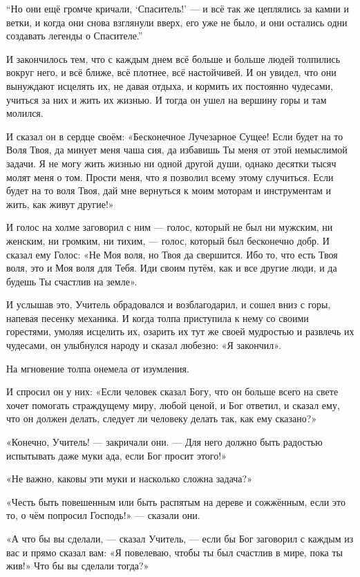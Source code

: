 ``Но они ещё громче кричали, `Спаситель!' --- и всё так же цеплялись за камни и ветки, и когда они снова взглянули вверх, его уже не было, и они остались одни создавать легенды о Спасителе.''

И закончилось тем, что с каждым днем всё больше и больше людей толпились вокруг него, и всё ближе,
всё плотнее, всё настойчивей. И он увидел, что они вынуждают исцелять их, не давая отдыха, и кормить их постоянно чудесами, учиться за них и жить их жизнью. И тогда он ушел на вершину горы и там молился.

И сказал он в сердце своём: «Бесконечное Лучезарное Сущее! Если будет на то Воля Твоя, да минует меня чаша сия, да избавишь Ты меня от этой немыслимой задачи. Я не могу жить жизнью ни одной другой души, однако десятки тысяч молят меня о том. Прости меня, что я позволил всему этому случиться. Если будет на то воля Твоя, дай мне вернуться к моим моторам и инструментам и жить, как живут другие!»

И голос на холме заговорил с ним --- голос, который не был ни мужским, ни женским, ни громким, ни тихим, --- голос, который был бесконечно добр. И сказал ему Голос: «Не Моя воля, но Твоя да свершится. Ибо то, что есть Твоя воля, это и Моя воля для Тебя. Иди своим путём, как и все другие люди, и да будешь Ты счастлив на земле».

И услышав это, Учитель обрадовался и возблагодарил, и сошел вниз с горы, напевая песенку
механика. И когда толпа приступила к нему со своими горестями, умоляя исцелить их, озарить их тут
же своей мудростью и развлечь их чудесами, он улыбнулся народу и сказал любезно: «Я закончил».

На мгновение толпа онемела от изумления.

И спросил он у них: «Если человек сказал Богу, что он больше всего на свете хочет помогать страждущему миру, любой ценой, и Бог ответил, и сказал ему, что он должен делать, следует ли человеку делать так, как ему сказано?»

«Конечно, Учитель! --- закричали они. --- Для него должно быть радостью испытывать даже муки ада, если Бог просит этого!»

«Не важно, каковы эти муки и насколько сложна задача?»

«Честь быть повешенным или быть распятым на дереве и сожжённым, если это то, о чём попросил Господь!» --- сказали они.

«А что бы вы сделали, --- сказал Учитель, --- если бы Бог заговорил с каждым из вас и прямо сказал вам: «Я повелеваю, чтобы ты был счастлив в мире, пока ты жив!» Что бы вы сделали тогда?»

